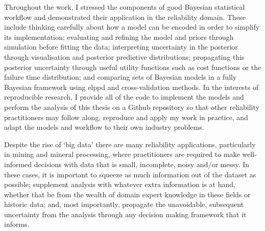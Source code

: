 Throughout the work, I stressed the components of good Bayesian statistical workflow and demonstrated their application in the reliability domain. These include thinking carefully about how a model can be encoded in order to simplify its implementation; evaluating and refining the model and priors through simulation before fitting the data; interpreting uncertainty in the posterior through visualisation and posterior predictive distributions; propagating this posterior uncertainty through useful utility functions such as cost functions or the failure time distribution; and comparing sets of Bayesian models in a fully Bayesian framework using elppd and cross-validation methods. In the interests of reproducible research, I provide all of the code to implement the models and perform the analysis of this thesis on a Github repository \citep{code_repo} so that other reliability practitioners may follow along, reproduce and apply my work in practice, and adapt the models and workflow to their own industry problems.

Despite the rise of `big data' there are many reliability applications, particularly in mining and mineral processing, where practitioners are required to make well-informed decisions with data that is small, incomplete, noisy and/or messy. In these cases, it is important to squeeze as much information out of the dataset as possible; supplement analysis with whatever extra information is at hand, whether that be from the wealth of domain expert knowledge in these fields or historic data; and, most importantly, propagate the unavoidable, subsequent uncertainty from the analysis through any decision making framework that it informs.

